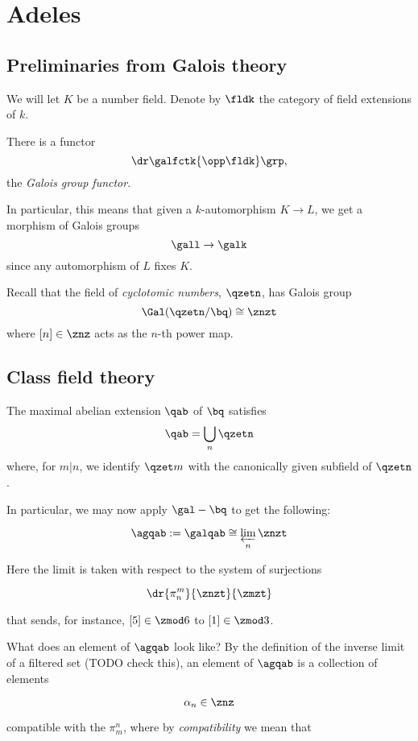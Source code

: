 \chapter{Adeles}

\section{Preliminaries from Galois theory}
We will let $K$ be a number field.
Denote by $\fldk$ the category of field extensions of $k$.

\begin{thm}
  There is a functor
  \[\dr \galfctk {\opp\fldk} \grp,\]
  the \textit{Galois group functor}.
\end{thm}

In particular, this means that given a $k$-automorphism $K\to L$, we get a
morphism of Galois groups
\[\gall \to \galk\]
since any automorphism of $L$ fixes $K$.

Recall that the field of \textit{cyclotomic numbers}, $\qzetn$, has Galois
group
\[\Gal(\qzetn/\bq) \cong \znzt \]
where $[n]\in\znz$ acts as the $n$-th power map.

\section{Class field theory}

\begin{thm}
  The maximal abelian extension $\qab$ of $\bq$ satisfies
  \[ \qab = \bigcup_n \qzetn \]
  where, for $m|n$, we identify $\qzet m$ with the canonically given subfield of
  $\qzetn$.
\end{thm}

In particular, we may now apply $\gal - \bq$ to get the following:

\[ \agqab := \galqab \cong \varprojlim_n \znzt \]
 
Here the limit is taken with respect to the system of surjections

\[ \dr {\pi_ n^m} {\znzt} {\zmzt} \]

that sends, for instance, $[5]\in{\zmod 6}$ to $[1]\in\zmod 3$.

What does an element of $\agqab$ look like? By the definition of the inverse
limit of a filtered set (TODO check this), an element of $\agqab$ is a collection of
elements

\[ \alpha_n \in \znz \]

compatible with the $\pi_m^n$, where by
\textit{compatibility} we mean that

